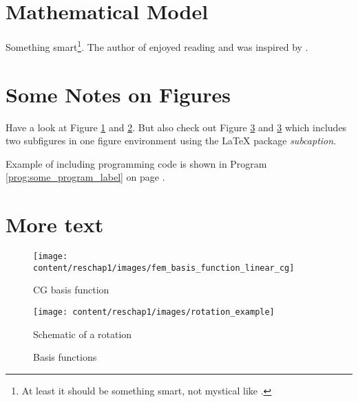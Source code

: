 \section{Mathematical Model}
Something smart\footnote{At least it should be something smart, not mystical like \cite{ExampleArticle1984}.}. The author of \cite{EmmitBrown1955} enjoyed reading and was inspired by \cite{TwentyThousandLeaguesUnderTheSea}.

\section{Some Notes on Figures}
Have a look at Figure \ref{fig:basis_fun_cg} and \ref{fig:rotation_schematic}. But also check out Figure \ref{fig:basis_functions} and \ref{fig:basis_functions} which includes two subfigures in one figure environment using the \LaTeX{} package \textsl{subcaption}.

Example of including programming code is shown in Program \ref{prog:some_program_label} on page \pageref{prog:some_program_label}.

\section{More text}
\lipsum[1-3]

\begin{figure}[p]
 \centering
 \texttt{[image: content/reschap1/images/fem\_basis\_function\_linear\_cg]}
 \caption[Basis function]{CG basis function}
 \label{fig:basis_fun_cg}
\end{figure}

\begin{figure}[p]
 \centering
 \texttt{[image: content/reschap1/images/rotation\_example]}
 \caption{Schematic of a rotation}
 \label{fig:rotation_schematic}
\end{figure}

\begin{figure}[p!]
 \centering
 \captionsetup[sub]{skip=0ex}
 \hfill
%
 \caption{Basis functions}
 \label{fig:basis_functions}
\end{figure}

\clearpage
\begin{program}[p]

\end{program}
